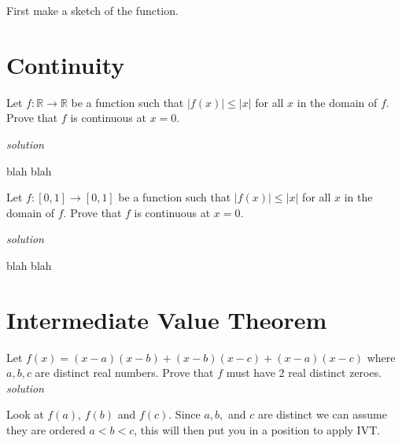 \documentclass{amsbook}
\begin{document}
\begin{Answer}[ref={2b2}]
  First make a sketch of the function.
\end{Answer}

\section{Continuity}
\begin{Exercise}[title={A Bounded Function around Zero}, difficulty=1 , label=2c1 ]
	Let $f: \mathbb{R} \to \mathbb{R}$ be a function such that $|f(x)| \leq |x| $ for all $x$ in the domain of $f$.  Prove that $f$ is continuous at $x=0$.

	\hfill \emph{solution} 
\end{Exercise}

\begin{Answer}[ref={2c1}]
	blah blah
\end{Answer}

\begin{Exercise}[title={Some Points Don't Move That Much}, difficulty=1 , label=2c2 ]
	Let $f:[0,1] \to [0,1]$ be a function such that $|f(x)| \leq |x| $ for all $x$ in the domain of $f$.  Prove that $f$ is continuous at $x=0$.

	\hfill \emph{solution} 
\end{Exercise}

\begin{Answer}[ref={2c2}]
	blah blah
\end{Answer}




\section{Intermediate Value Theorem}
\begin{Exercise}[title={A Polynomial with Real Roots}, difficulty=1, label=2d1]
Let $f(x)=(x-a)(x-b)+(x-b)(x-c)+(x-a)(x-c)$ where $a,b,c$ are distinct real numbers. Prove that $f$ must have 2 real distinct zeroes.
\hfill \emph{solution} 

\end{Exercise}

\begin{Answer}[ref={2d1}]
	Look at $f(a)$, $f(b)$ and $f(c)$.  Since $a,b,$ and $c$ are distinct we can assume they are ordered $a<b<c$, this will then put you in a position to apply IVT.
\end{Answer}
\end{document}
